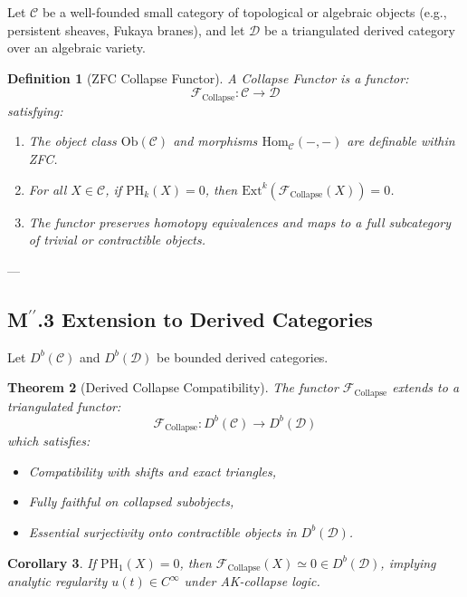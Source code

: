 \documentclass[11pt]{article}
\newtheorem{theorem}{Theorem}[section]
\newtheorem{definition}[theorem]{Definition}
\newtheorem{corollary}[theorem]{Corollary}
\begin{document}
\begin{axiom}
\begin{axiom}
{{Let $\mathcal{C}$ be a well-founded small category of topological or algebraic objects (e.g., persistent sheaves, Fukaya branes),  
and let $\mathcal{D}$ be a triangulated derived category over an algebraic variety.

\begin{definition}[ZFC Collapse Functor]
A \emph{Collapse Functor} is a functor:
\[
\mathcal{F}_{\text{Collapse}} : \mathcal{C} \to \mathcal{D}
\]
satisfying:
\begin{enumerate}
  \item The object class $\mathrm{Ob}(\mathcal{C})$ and morphisms $\mathrm{Hom}_\mathcal{C}(-,-)$ are definable within ZFC.
  \item For all $X \in \mathcal{C}$, if $\mathrm{PH}_k(X) = 0$, then $\mathrm{Ext}^k(\mathcal{F}_{\text{Collapse}}(X)) = 0$.
  \item The functor preserves homotopy equivalences and maps to a full subcategory of trivial or contractible objects.
\end{enumerate}
\end{definition}

---

\subsection*{M$^{\prime\prime}$.3 Extension to Derived Categories}

Let $D^b(\mathcal{C})$ and $D^b(\mathcal{D})$ be bounded derived categories.

\begin{theorem}[Derived Collapse Compatibility]
The functor $\mathcal{F}_{\text{Collapse}}$ extends to a triangulated functor:
\[
\mathcal{F}_{\text{Collapse}} : D^b(\mathcal{C}) \to D^b(\mathcal{D})
\]
which satisfies:
\begin{itemize}
  \item Compatibility with shifts and exact triangles,
  \item Fully faithful on collapsed subobjects,
  \item Essential surjectivity onto contractible objects in $D^b(\mathcal{D})$.
\end{itemize}
\end{theorem}

\begin{corollary}
If \( \mathrm{PH}_1(X) = 0 \), then \( \mathcal{F}_{\text{Collapse}}(X) \simeq 0 \in D^b(\mathcal{D}) \),  
implying analytic regularity \( u(t) \in C^\infty \) under AK-collapse logic.
\end{corollary}

}}
\end{axiom}
\end{axiom}
\end{document}
